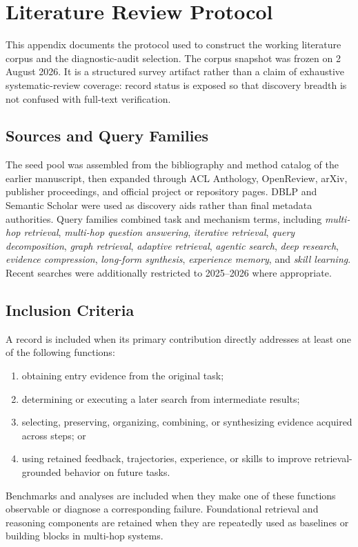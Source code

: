 \section{Literature Review Protocol}
\label{app:review_protocol}

This appendix documents the protocol used to construct the working literature corpus and the diagnostic-audit selection. The corpus snapshot was frozen on 2 August 2026. It is a structured survey artifact rather than a claim of exhaustive systematic-review coverage: record status is exposed so that discovery breadth is not confused with full-text verification.

\subsection{Sources and Query Families}
The seed pool was assembled from the bibliography and method catalog of the earlier manuscript, then expanded through ACL Anthology, OpenReview, arXiv, publisher proceedings, and official project or repository pages. DBLP and Semantic Scholar were used as discovery aids rather than final metadata authorities. Query families combined task and mechanism terms, including \emph{multi-hop retrieval}, \emph{multi-hop question answering}, \emph{iterative retrieval}, \emph{query decomposition}, \emph{graph retrieval}, \emph{adaptive retrieval}, \emph{agentic search}, \emph{deep research}, \emph{evidence compression}, \emph{long-form synthesis}, \emph{experience memory}, and \emph{skill learning}. Recent searches were additionally restricted to 2025--2026 where appropriate.

\subsection{Inclusion Criteria}
A record is included when its primary contribution directly addresses at least one of the following functions:
\begin{enumerate}[leftmargin=1.5em]
\item obtaining entry evidence from the original task;
\item determining or executing a later search from intermediate results;
\item selecting, preserving, organizing, combining, or synthesizing evidence acquired across steps; or
\item using retained feedback, trajectories, experience, or skills to improve retrieval-grounded behavior on future tasks.
\end{enumerate}
Benchmarks and analyses are included when they make one of these functions observable or diagnose a corresponding failure. Foundational retrieval and reasoning components are retained when they are repeatedly used as baselines or building blocks in multi-hop systems.

